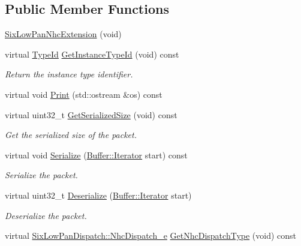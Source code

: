 \subsection*{Public Member Functions}
\begin{DoxyCompactItemize}
\item 
\hyperlink{classns3_1_1SixLowPanNhcExtension_ab2e0230eed57219aed5ddc7028245cb5}{Six\+Low\+Pan\+Nhc\+Extension} (void)
\item 
virtual \hyperlink{classns3_1_1TypeId}{Type\+Id} \hyperlink{classns3_1_1SixLowPanNhcExtension_a04d294cd757e931b60dabc6efa548b2e}{Get\+Instance\+Type\+Id} (void) const 
\begin{DoxyCompactList}\small\item\em Return the instance type identifier. \end{DoxyCompactList}\item 
virtual void \hyperlink{classns3_1_1SixLowPanNhcExtension_ada32a5080dcbdb7c5cc4b08b6d0b238c}{Print} (std\+::ostream \&os) const 
\item 
virtual uint32\+\_\+t \hyperlink{classns3_1_1SixLowPanNhcExtension_acb1868b61e13ad7cf29c77d952ade97e}{Get\+Serialized\+Size} (void) const 
\begin{DoxyCompactList}\small\item\em Get the serialized size of the packet. \end{DoxyCompactList}\item 
virtual void \hyperlink{classns3_1_1SixLowPanNhcExtension_a10fa0057db4347789cfe22f365ee0ba2}{Serialize} (\hyperlink{classns3_1_1Buffer_1_1Iterator}{Buffer\+::\+Iterator} start) const 
\begin{DoxyCompactList}\small\item\em Serialize the packet. \end{DoxyCompactList}\item 
virtual uint32\+\_\+t \hyperlink{classns3_1_1SixLowPanNhcExtension_ae4b9a1a981531508887903c32a2cb599}{Deserialize} (\hyperlink{classns3_1_1Buffer_1_1Iterator}{Buffer\+::\+Iterator} start)
\begin{DoxyCompactList}\small\item\em Deserialize the packet. \end{DoxyCompactList}\item 
virtual \hyperlink{classns3_1_1SixLowPanDispatch_acbf93399dca3b5424dcc76de45a57f5f}{Six\+Low\+Pan\+Dispatch\+::\+Nhc\+Dispatch\+\_\+e} \hyperlink{classns3_1_1SixLowPanNhcExtension_a406263db25af25d718bb90634c9c313a}{Get\+Nhc\+Dispatch\+Type} (void) const 

\end{DoxyCompactItemize}
